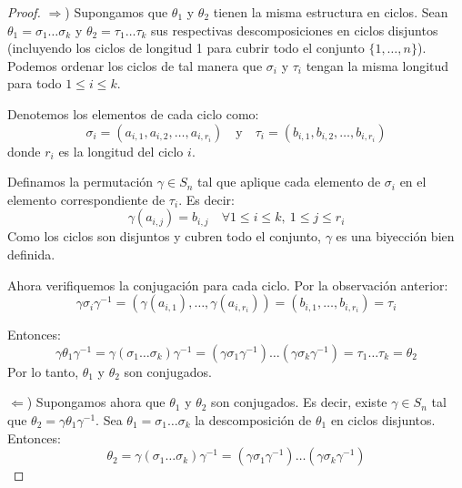 \begin{proof}
    $\Rightarrow$) Supongamos que $\theta_1$ y $\theta_2$ tienen la misma estructura en ciclos.
    Sean $\theta_1 = \sigma_1 \dots \sigma_k$ y $\theta_2 = \tau_1 \dots \tau_k$ sus respectivas descomposiciones en ciclos disjuntos (incluyendo los ciclos de longitud 1 para cubrir todo el conjunto $\{1, \dots, n\}$).
    Podemos ordenar los ciclos de tal manera que $\sigma_i$ y $\tau_i$ tengan la misma longitud para todo $1 \leq i \leq k$.
    
    Denotemos los elementos de cada ciclo como:
    \begin{equation*}
        \sigma_i = (a_{i,1}, a_{i,2}, \dots, a_{i,r_i}) \quad \text{y} \quad \tau_i = (b_{i,1}, b_{i,2}, \dots, b_{i,r_i})
    \end{equation*}
    donde $r_i$ es la longitud del ciclo $i$.
    
    Definamos la permutación $\gamma \in S_n$ tal que aplique cada elemento de $\sigma_i$ en el elemento correspondiente de $\tau_i$. Es decir:
    \begin{equation*}
        \gamma(a_{i,j}) = b_{i,j} \quad \forall 1 \leq i \leq k, \ 1 \leq j \leq r_i
    \end{equation*}
    Como los ciclos son disjuntos y cubren todo el conjunto, $\gamma$ es una biyección bien definida.
    
    Ahora verifiquemos la conjugación para cada ciclo. Por la observación anterior:
    \begin{equation*}
        \gamma \sigma_i \gamma^{-1} = (\gamma(a_{i,1}), \dots, \gamma(a_{i,r_i})) = (b_{i,1}, \dots, b_{i,r_i}) = \tau_i
    \end{equation*}
    
    Entonces:
    \begin{equation*}
        \gamma \theta_1 \gamma^{-1} = \gamma (\sigma_1 \dots \sigma_k) \gamma^{-1} = (\gamma \sigma_1 \gamma^{-1}) \dots (\gamma \sigma_k \gamma^{-1}) = \tau_1 \dots \tau_k = \theta_2
    \end{equation*}
    Por lo tanto, $\theta_1$ y $\theta_2$ son conjugados.

    $\Leftarrow$) Supongamos ahora que $\theta_1$ y $\theta_2$ son conjugados. Es decir, existe $\gamma \in S_n$ tal que $\theta_2 = \gamma \theta_1 \gamma^{-1}$.
    Sea $\theta_1 = \sigma_1 \dots \sigma_k$ la descomposición de $\theta_1$ en ciclos disjuntos. Entonces:
    \begin{equation*}
        \theta_2 = \gamma (\sigma_1 \dots \sigma_k) \gamma^{-1} = (\gamma \sigma_1 \gamma^{-1}) \dots (\gamma \sigma_k \gamma^{-1})
    \end{equation*}
    

\end{proof}
